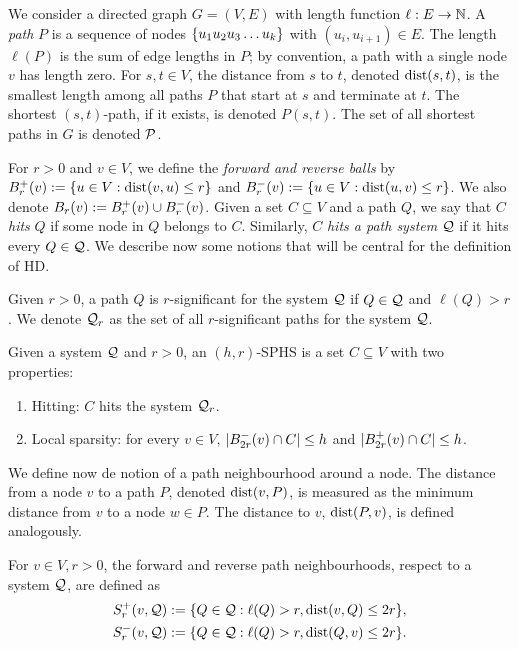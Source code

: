 
We consider a directed graph $G=(V,E)$ with length function $\ell:E\to \N$.
A \emph{path} $P$ is a sequence of nodes $\crl*{u_1u_2u_3\ldots u_k}$ with $(u_i,u_{i+1})\in E$. 
The length $\ell(P)$ is the sum of edge lengths in $P$; by convention, a path with a single node $v$ has length zero.
For $s,t\in V$, the distance from $s$ to $t$, denoted $\dist(s,t)$, is the smallest length among all paths $P$ that start at $s$ and terminate at $t$.
The shortest $(s,t)$-path, if it exists, is denoted $P(s,t)$.
The set of all shortest paths in $G$ is denoted $\calP$.

For $r>0$ and $v\in V$, we define the \emph{forward and reverse balls} by $\Bf_r(v):=\{u\in V: \dist(v,u)\leq r\}$ and $\Bb_r(v):=\{u\in V: \dist(u,v)\leq r\}$.
We also denote $B_r(v):=\Bf_r(v)\cup\Bb_r(v)$.
Given a set $C\subseteq V$ and a path $Q$, we say that $C$ \emph{hits} $Q$ if some node in $Q$ belongs to $C$.
Similarly, $C$ \emph{hits a path system} $\calQ$ if it hits every $Q\in\calQ$.
We describe now some notions that will be central for the definition of HD.

\begin{definition}
Given $r>0$, a path $Q$ is $r$-significant for the system $\calQ$ if $Q\in\calQ$ and $\ell(Q)>r$.
We denote $\calQ_r$ as the set of all $r$-significant paths for the system $\calQ$.
\end{definition}

\begin{definition}
Given a system $\calQ$ and $r>0$, an $(h,r)$-SPHS is a set $C\subseteq V$ with two properties: 
\begin{enumerate}
\item Hitting: $C$ hits the system $\calQ_r$.
\item Local sparsity: for every $v\in V$, $\card{\Bb_{2r}(v)\cap C}\leq h$ and $\card{\Bf_{2r}(v)\cap C}\leq h$.
\end{enumerate}
\end{definition}

We define now de notion of a path neighbourhood around a node.
The distance from a node $v$ to a path $P$, denoted $\dist(v,P)$, is measured as the minimum distance from $v$ to a node $w\in P$.
The distance to $v$, $\dist(P,v)$, is defined analogously.

\begin{definition}
For $v\in V, r>0$, the forward and reverse path neighbourhoods, respect to a system $\calQ$, are defined as 
\begin{align*}
S_r^+(v,\calQ) &:=\{Q\in\calQ:\ell(Q)>r,  \dist(v,Q)\leq 2r \}, \\  
S_r^-(v,\calQ) &:=\{Q\in\calQ:\ell(Q)>r,  \dist(Q,v)\leq 2r \}.
\end{align*}
\end{definition}


